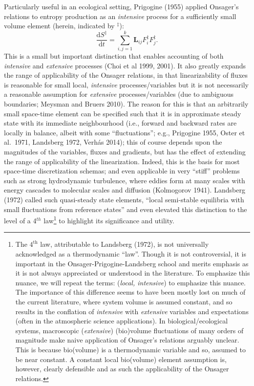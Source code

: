 \documentclass[11pt,letterpaper,]{paper}
\begin{document}
Particularly useful in an ecological setting, Prigogine (1955) applied
Onsager's relations to entropy production as an \emph{intensive} process
for a sufficiently small volume element (herein, indicated by
\({}^\ddagger\)):
\[\frac{\mathrm{d} S^\ddagger}{\mathrm{d} t} = \sum_{i,j=1}^{k} \boldsymbol{L}_{ij} F_i^\ddagger F_j^\ddagger.\]
This is a small but important distinction that enables accounting of
both \emph{intensive} and \emph{extensive} processes (Choi et al 1999,
2001). It also greatly expands the range of applicability of the Onsager
relations, in that linearizability of fluxes is reasonable for small
local, \emph{intensive} processes/variables but it is not necessarily a
reasonable assumption for \emph{extensive} processes/variables (due to
ambiguous boundaries; Meysman and Bruers 2010). The reason for this is
that an arbitrarily small space-time element can be specified such that
it is in approximate steady state with its immediate neighbourhood
(i.e., forward and backward rates are locally in balance, albeit with
some ``fluctuations''; e.g., Prigogine 1955, Oster et al.~1971,
Landsberg 1972, Verhás 2014); this of course depends upon the magnitudes
of the variables, fluxes and gradients, but has the effect of extending
the range of applicability of the linearization. Indeed, this is the
basis for most space-time discretization schemas; and even applicable in
very ``stiff'' problems such as strong hydrodynamic turbulence, where
eddies form at many scales with energy cascades to molecular scales and
diffusion (Kolmogorov 1941). Landsberg (1972) called such quasi-steady
state elements, ``local semi-stable equilibria with small fluctuations
from reference states'' and even elevated this distinction to the level
of a 4\(^{th}\) law\footnote{The \(4^\text{th}\) law, attributable to
  Landsberg (1972), is not universally acknowledged as a thermodynamic
  ``law''. Though it is not controversial, it is important in the
  Onsager-Prigogine-Landsberg school and merits emphasis as it is not
  always appreciated or understood in the literature. To emphasize this
  nuance, we will repeat the terms: (\emph{local, intensive}) to
  emphasize this nuance. The importance of this difference seems to have
  been mostly lost on much of the current literature, where system
  volume is assumed constant, and so results in the conflation of
  \emph{intensive} with \emph{extensive} variables and expectations
  (often in the atmospheric science applications). In
  biological/ecological systems, macroscopic (\emph{extensive})
  (bio)volume fluctuations of many orders of magnitude make naive
  application of Onsager's relations arguably unclear. This is because
  bio(volume) is a thermodynamic variable and so, assumed to be near
  constant. A constant local bio(volume) element assumption is, however,
  clearly defensible and as such the applicability of the Onsager
  relations.} to highlight its significance and utility.
\end{document}
